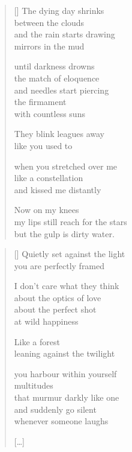 \documentclass[14pt]{extbook}
\newcommand*{\centeredornament}{\centerline{\pgfornament[width=6cm]{88}}}
\begin{document}
\newpage

\vspace*{-15mm}
\centeredornament
\vspace*{-7mm}


\settowidth{\versewidth}{my lips still reach for the stars}

\begin{verse}[\versewidth]
  The dying day shrinks \\
  between the clouds \\
  and the rain starts drawing \\
  mirrors in the mud

  until darkness drowns \\
  the match of eloquence \\
  and needles start piercing \\
  the firmament \\
  with countless suns

  They blink leagues away \\
  like you used to

  when you stretched over me \\
  like a constellation \\
  and kissed me distantly

  Now on my knees \\
  my lips still reach for the stars \\
  but the gulp is dirty water.
\end{verse}


\newpage

\vspace*{-15mm}
\centeredornament
\vspace*{-7mm}


\settowidth{\versewidth}{that murmur darkly like one}

\begin{verse}[\versewidth]
  Quietly set against the light \\
  you are perfectly framed

  I don't care what they think \\
  about the optics of love \\
  about the perfect shot \\
  at wild happiness

  Like a forest \\
  leaning against the twilight

  you harbour within yourself \\
  multitudes \\
  that murmur darkly like one \\
  and suddenly go silent \\
  whenever someone laughs

  \hfill [\ldots]
\end{verse}
\end{document}
